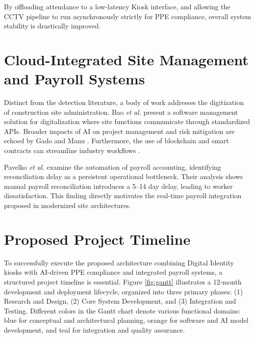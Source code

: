 \documentclass[conference]{IEEEtran}
\begin{document}
By offloading attendance to a low-latency Kiosk interface, and allowing the CCTV pipeline to run asynchronously strictly for PPE compliance, overall system stability is drastically improved.

\section{Cloud-Integrated Site Management and Payroll Systems}
Distinct from the detection literature, a body of work addresses the digitization of construction site administration. Bao \textit{et al.} \cite{bao2023} present a software management solution for digitalization where site functions communicate through standardized APIs. Broader impacts of AI on project management and risk mitigation are echoed by Gado \cite{gado2024} and Manu \cite{manu2024}. Furthermore, the use of blockchain and smart contracts can streamline industry workflows \cite{ye2022}.

Pavelko \textit{et al.} \cite{pavelko2023} examine the automation of payroll accounting, identifying reconciliation delay as a persistent operational bottleneck. Their analysis shows manual payroll reconciliation introduces a 5–14 day delay, leading to worker dissatisfaction. This finding directly motivates the real-time payroll integration proposed in modernized site architectures.

\section{Proposed Project Timeline}
To successfully execute the proposed architecture combining Digital Identity kiosks with AI-driven PPE compliance and integrated payroll systems, a structured project timeline is essential. Figure \ref{fig:gantt} illustrates a 12-month development and deployment lifecycle, organized into three primary phases: (1) Research and Design, (2) Core System Development, and (3) Integration and Testing. Different colors in the Gantt chart denote various functional domains: blue for conceptual and architectural planning, orange for software and AI model development, and teal for integration and quality assurance.
\end{document}

